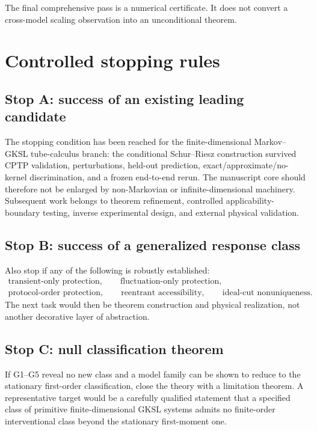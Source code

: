 \documentclass[11pt]{article}
\theoremstyle{definition}
\theoremstyle{remark}
\begin{document}
The final comprehensive pass is a numerical certificate.  It does not convert a cross-model scaling observation into an unconditional theorem.

\section{Controlled stopping rules}

\subsection{Stop A: success of an existing leading candidate}

The stopping condition has been reached for the finite-dimensional Markov--GKSL tube-calculus branch: the conditional Schur--Riesz construction survived CPTP validation, perturbations, held-out prediction, exact/approximate/no-kernel discrimination, and a frozen end-to-end rerun.  The manuscript core should therefore not be enlarged by non-Markovian or infinite-dimensional machinery.  Subsequent work belongs to theorem refinement, controlled applicability-boundary testing, inverse experimental design, and external physical validation.

\subsection{Stop B: success of a generalized response class}

Also stop if any of the following is robustly established:
\begin{equation}
\begin{gathered}
\text{transient-only protection},\qquad
\text{fluctuation-only protection},\\
\text{protocol-order protection},\qquad
\text{reentrant accessibility},\qquad
\text{ideal-cut nonuniqueness}.
\end{gathered}
\end{equation}
The next task would then be theorem construction and physical realization, not another decorative layer of abstraction.

\subsection{Stop C: null classification theorem}

If G1--G5 reveal no new class and a model family can be shown to reduce to the stationary first-order classification, close the theory with a limitation theorem. A representative target would be a carefully qualified statement that a specified class of primitive finite-dimensional GKSL systems admits no finite-order interventional class beyond the stationary first-moment one.
\end{document}
